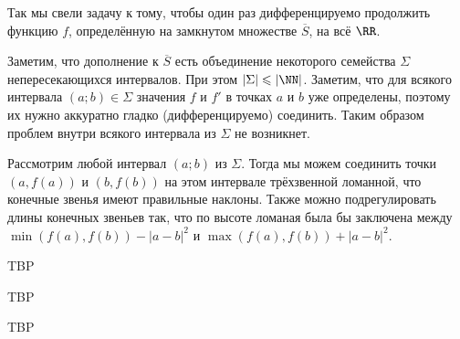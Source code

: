 \documentclass[12pt,a4paper]{article}
\begin{document}
\begin{enumproblem}
        Так мы свели задачу к тому, чтобы один раз дифференцируемо продолжить функцию $f$, определённую на замкнутом множестве $\overline{S}$, на всё $\RR$.

        Заметим, что дополнение к $\overline{S}$ есть объединение некоторого семейства $\Sigma$ непересекающихся интервалов. При этом $|\Sigma| \leqslant |\NN|$. Заметим, что для всякого интервала $(a; b) \in \Sigma$ значения $f$ и $f'$ в точках $a$ и $b$ уже определены, поэтому их нужно аккуратно гладко (дифференцируемо) соединить. Таким образом проблем внутри всякого интервала из $\Sigma$ не возникнет.

        Рассмотрим любой интервал $(a; b)$ из $\Sigma$. Тогда мы можем соединить точки $(a, f(a))$ и $(b, f(b))$ на этом интервале трёхзвенной ломанной, что конечные звенья имеют правильные наклоны. Также можно подрегулировать длины конечных звеньев так, что по высоте ломаная была бы заключена между $\min(f(a), f(b)) - |a-b|^2$ и $\max(f(a), f(b)) + |a-b|^2$.
    \end{enumproblem}

    \begin{enumproblem}
        TBP
    \end{enumproblem}

    \begin{enumproblem}
        TBP
    \end{enumproblem}

    \begin{enumproblem}
        TBP
    \end{enumproblem}
    
\end{document}
